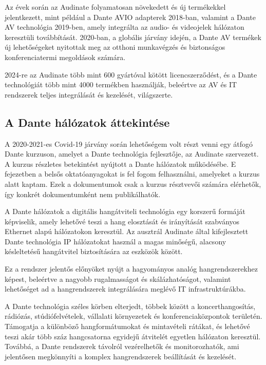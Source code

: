 Az évek során az Audinate folyamatosan növekedett és új termékekkel jelentkezett, 
mint például a Dante AVIO adapterek 2018-ban, valamint a Dante AV technológia 2019-ben, 
amely integrálta az audio- és videojelek hálózaton keresztüli továbbítását. 2020-ban, 
a globális járvány idején, a Dante AV termékek új lehetőségeket nyitottak meg az 
otthoni munkavégzés és biztonságos konferenciatermi megoldások számára.

2024-re az Audinate több mint 600 gyártóval kötött licencszerződést, és a Dante 
technológiát több mint 4000 termékben használják, beleértve az AV és IT rendszerek 
teljes integrálását és kezelését, világszerte.
\subsection{A Dante hálózatok áttekintése}
A 2020-2021-es Covid-19 járvány során lehetőségem volt részt venni egy átfogó Dante
kurzuson, amelyet a Dante technológia fejlesztője, az Audinate szervezett. A kurzus
részletes betekintést nyújtott a Dante hálózatok működésébe. E fejezetben a belsős
oktatóanyagokat is fel fogom felhasználni, amelyeket a kurzus alatt kaptam. Ezek a dokumentumok
csak a kurzus résztvevői számára elérhetők, így konkrét dokumentumként nem publikálhatók. 

A Dante hálózatok a digitális hangátviteli technológia egy korszerű formáját képviselik, 
amely lehetővé teszi a hang elosztását és irányítását szabványos Ethernet alapú hálózatokon 
keresztül. Az ausztrál Audinate által kifejlesztett Dante technológia IP hálózatokat használ 
a magas minőségű, alacsony késleltetésű hangátvitel biztosítására az eszközök között. 

Ez a rendszer jelentős előnyöket nyújt a hagyományos analóg hangrendszerekhez képest, 
beleértve a nagyobb rugalmasságot és skálázhatóságot, valamint lehetőséget ad a hangrendszerek 
integrálására meglévő IT infrastruktúrákba. 

A Dante technológia széles körben elterjedt, többek között a koncerthangosítás, rádiózás, 
stúdiófelvételek, vállalati környezetek és konferenciaközpontok területén. Támogatja a különböző 
hangformátumokat és mintavételi rátákat, és lehetővé teszi akár több száz hangcsatorna egyidejű 
átvitelét egyetlen hálózaton keresztül. Továbbá, a Dante rendszerek távolról vezérelhetők és 
monitorozhatók, ami jelentősen megkönnyíti a komplex hangrendszerek beállítását és kezelését.

